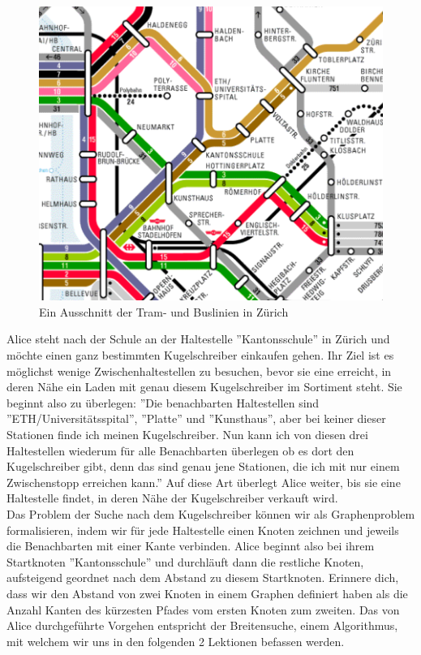 \begin{figure}[h]
    \centering
    \includegraphics[width=\linewidth]{Pictures/Tram1.PNG}
    \caption{Ein Ausschnitt der Tram- und Buslinien in Zürich}
\end{figure}

Alice steht nach der Schule an der Haltestelle ''Kantonsschule'' in Zürich und möchte einen ganz bestimmten Kugelschreiber einkaufen gehen. Ihr Ziel ist es möglichst wenige Zwischenhaltestellen zu besuchen, bevor sie eine erreicht, in deren Nähe ein Laden mit genau diesem Kugelschreiber im Sortiment steht. Sie beginnt also zu überlegen: ''Die benachbarten Haltestellen sind\\ ''ETH/Universitätsspital'', ''Platte'' und ''Kunsthaus'', aber bei keiner dieser Stationen finde ich meinen Kugelschreiber. Nun kann ich von diesen drei Haltestellen wiederum für alle Benachbarten überlegen ob es dort den Kugelschreiber gibt, denn das sind genau jene Stationen, die ich mit nur einem Zwischenstopp erreichen kann.'' Auf diese Art überlegt Alice weiter, bis sie eine Haltestelle findet, in deren Nähe der Kugelschreiber verkauft wird. \\

Das Problem der Suche nach dem Kugelschreiber können wir als Graphenproblem formalisieren, indem wir für jede Haltestelle einen Knoten zeichnen und jeweils die Benachbarten mit einer Kante verbinden. Alice beginnt also bei ihrem Startknoten ''Kantonsschule'' und durchläuft dann die restliche Knoten, aufsteigend geordnet nach dem Abstand zu diesem Startknoten. Erinnere dich, dass wir den Abstand von zwei Knoten in einem Graphen definiert haben als die Anzahl Kanten des kürzesten Pfades vom ersten Knoten zum zweiten. Das von Alice durchgeführte Vorgehen entspricht der Breitensuche, einem Algorithmus, mit welchem wir uns in den folgenden 2 Lektionen befassen werden.\\

